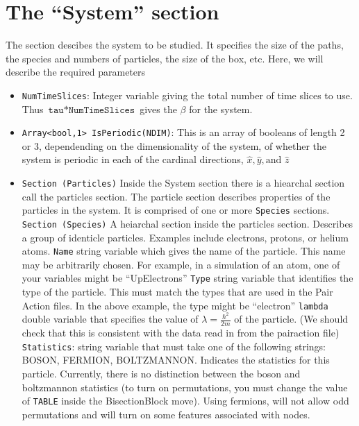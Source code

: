 \documentclass{book}
\begin{document}
\section{The ``System'' section}
   The section descibes the system to be studied.  It specifies the
   size of the paths, the species and numbers of particles, the size
   of the box, etc.  Here, we will describe the required parameters
\begin{itemize}
   \item \texttt{NumTimeSlices}:  Integer variable giving the total
   number of time slices to use.  Thus
   $\texttt{tau}*\texttt{NumTimeSlices}$ gives the $\beta$ for the
   system.
   \item \texttt{Array<bool,1> IsPeriodic(NDIM)}:  This is an array of
   booleans of length 2 or 3, dependending on the dimensionality of
   the system, of whether the system is periodic in each of the
   cardinal directions, $\hat{x},\hat{y},\text{and } \hat{z}$
   \item \texttt{Section (Particles)}  Inside the System section there
   is a hiearchal section call the particles section.  The particle
   section  describes properties of the  particles in the system.  It is comprised of one or more
   \texttt{Species} sections.
     \subitem \texttt{Section (Species)} A heiarchal section inside
   the particles section.  Describes a group of
        identicle particles.  Examples include electrons, protons,
        or helium atoms.
        \subsubitem \texttt{Name} string variable which gives the name
   of the particle. This name may be arbitrarily chosen.  For example,
   in a simulation of an atom, one of your variables might be
   ``UpElectrons''
       \subsubitem \texttt{Type} string variable that identifies the
   type of the particle. This must match the types that are used in
   the Pair Action files.  In the above example, the type might be
   ``electron''
       \subsubitem \texttt{lambda} double variable that specifies the
   value of $\lambda=\frac{\hbar^2}{2m}$ of the particle. (We should
   check that this is consistent with the data read in from the
   pairaction file)
       \subsubitem \texttt{Statistics}: string variable that must take
   one of the following strings: BOSON, FERMION, BOLTZMANNON.
   Indicates the statistics for this particle. Currently, there is no
   distinction between the boson and boltzmannon statistics (to turn
   on permutations, you must change the value of \texttt{TABLE} inside the
   BisectionBlock move).  Using fermions, will not allow odd
   permutations and will turn on some features associated with nodes.

\end{itemize}
\end{document}
